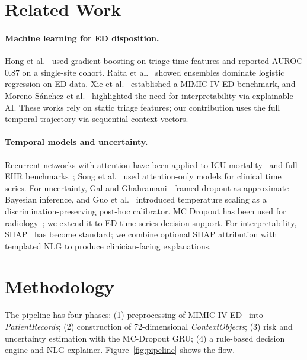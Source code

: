 \documentclass[runningheads]{llncs}
\begin{document}
\section{Related Work}

\paragraph{Machine learning for ED disposition.} Hong et al.~\cite{Hong2018} used gradient boosting on triage-time features and reported AUROC 0.87 on a single-site cohort. Raita et al.~\cite{Raita2019} showed ensembles dominate logistic regression on ED data. Xie et al.~\cite{Xie2022} established a MIMIC-IV-ED benchmark, and Moreno-S\'{a}nchez et al.~\cite{Moreno2024} highlighted the need for interpretability via explainable AI. These works rely on static triage features; our contribution uses the full temporal trajectory via sequential context vectors.

\paragraph{Temporal models and uncertainty.} Recurrent networks with attention have been applied to ICU mortality~\cite{Kaji2019,Bahdanau2015} and full-EHR benchmarks~\cite{Harutyunyan2019}; Song et al.~\cite{Song2018} used attention-only models for clinical time series. For uncertainty, Gal and Ghahramani~\cite{Gal2016} framed dropout as approximate Bayesian inference, and Guo et al.~\cite{Guo2017} introduced temperature scaling as a discrimination-preserving post-hoc calibrator. MC Dropout has been used for radiology~\cite{Calderon2022,Leibig2017}; we extend it to ED time-series decision support. For interpretability, SHAP~\cite{Lundberg2017,Lauritsen2020} has become standard; we combine optional SHAP attribution with templated NLG to produce clinician-facing explanations.

\section{Methodology}

The pipeline has four phases: (1) preprocessing of MIMIC-IV-ED~\cite{Johnson2023} into \textit{PatientRecords}; (2) construction of 72-dimensional \textit{ContextObjects}; (3) risk and uncertainty estimation with the MC-Dropout GRU; (4) a rule-based decision engine and NLG explainer. Figure~\ref{fig:pipeline} shows the flow.
\end{document}

